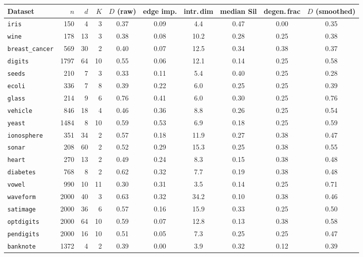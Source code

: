 \begin{tabular}{@{}lrrrcccccc@{}}
\toprule
Dataset & $n$ & $d$ & $K$ & $D$ (raw) & edge imp. & intr.\,dim & median Sil & degen.\,frac & $D$ (smoothed) \\
\midrule
\texttt{iris} & 150 & 4 & 3 & 0.37 & 0.09 & 4.4 & 0.47 & 0.00 & 0.35 \\
\texttt{wine} & 178 & 13 & 3 & 0.38 & 0.08 & 10.2 & 0.28 & 0.25 & 0.38 \\
\texttt{breast\_cancer} & 569 & 30 & 2 & 0.40 & 0.07 & 12.5 & 0.34 & 0.38 & 0.37 \\
\texttt{digits} & 1797 & 64 & 10 & 0.55 & 0.06 & 12.1 & 0.14 & 0.25 & 0.58 \\
\texttt{seeds} & 210 & 7 & 3 & 0.33 & 0.11 & 5.4 & 0.40 & 0.25 & 0.28 \\
\texttt{ecoli} & 336 & 7 & 8 & 0.39 & 0.22 & 6.0 & 0.25 & 0.25 & 0.39 \\
\texttt{glass} & 214 & 9 & 6 & 0.76 & 0.41 & 6.0 & 0.30 & 0.25 & 0.76 \\
\texttt{vehicle} & 846 & 18 & 4 & 0.46 & 0.36 & 8.8 & 0.26 & 0.25 & 0.54 \\
\texttt{yeast} & 1484 & 8 & 10 & 0.59 & 0.53 & 6.9 & 0.18 & 0.25 & 0.59 \\
\texttt{ionosphere} & 351 & 34 & 2 & 0.57 & 0.18 & 11.9 & 0.27 & 0.38 & 0.47 \\
\texttt{sonar} & 208 & 60 & 2 & 0.52 & 0.29 & 15.3 & 0.25 & 0.38 & 0.55 \\
\texttt{heart} & 270 & 13 & 2 & 0.49 & 0.24 & 8.3 & 0.15 & 0.38 & 0.48 \\
\texttt{diabetes} & 768 & 8 & 2 & 0.62 & 0.32 & 7.7 & 0.19 & 0.38 & 0.48 \\
\texttt{vowel} & 990 & 10 & 11 & 0.30 & 0.31 & 3.5 & 0.14 & 0.25 & 0.71 \\
\texttt{waveform} & 2000 & 40 & 3 & 0.63 & 0.32 & 34.2 & 0.10 & 0.38 & 0.46 \\
\texttt{satimage} & 2000 & 36 & 6 & 0.57 & 0.16 & 15.9 & 0.33 & 0.25 & 0.50 \\
\texttt{optdigits} & 2000 & 64 & 10 & 0.59 & 0.07 & 12.8 & 0.13 & 0.38 & 0.58 \\
\texttt{pendigits} & 2000 & 16 & 10 & 0.51 & 0.05 & 7.3 & 0.25 & 0.25 & 0.47 \\
\texttt{banknote} & 1372 & 4 & 2 & 0.39 & 0.00 & 3.9 & 0.32 & 0.12 & 0.39 \\
\bottomrule
\end{tabular}
